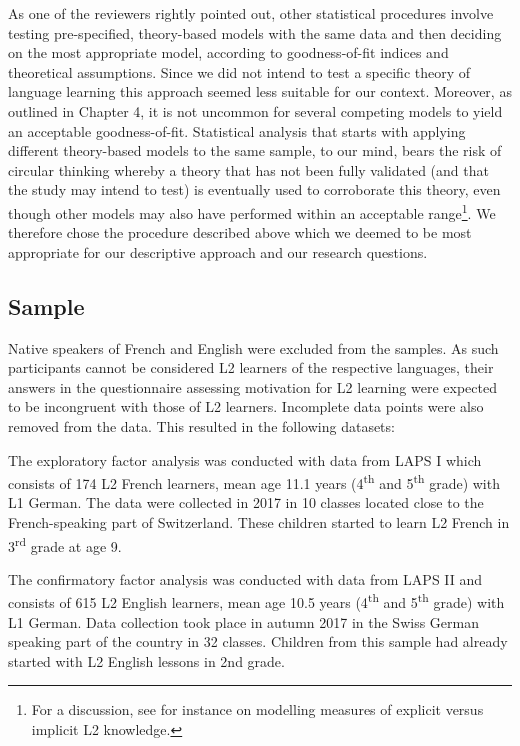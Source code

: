\documentclass[output=paper]{langsci/langscibook}
\begin{document}
As one of the reviewers rightly pointed out, other statistical procedures involve testing pre-specified, theory-based models with the same data and then deciding on the most appropriate model, according to goodness-of-fit indices and theoretical assumptions. Since we did not intend to test a specific theory of language learning this approach seemed less suitable for our context. Moreover, as outlined in Chapter 4, it is not uncommon for several competing models to yield an acceptable goodness-of-fit. Statistical analysis that starts with applying different theory-based models to the same sample, to our mind, bears the risk of circular thinking whereby a theory that has not been fully validated (and that the study may intend to test) is eventually used to corroborate this theory, even though other models may also have performed within an acceptable range\footnote{For a discussion, see for instance \citet{VafaeeEtAl2017} on modelling measures of explicit versus implicit L2 knowledge.}. We therefore chose the procedure described above which we deemed to be most appropriate for our descriptive approach and our research questions.

\subsection{Sample}

Native speakers of French and English were excluded from the samples. As such participants cannot be considered L2 learners of the respective languages, their answers in the questionnaire assessing motivation for L2 learning were expected to be incongruent with those of L2 learners. Incomplete data points were also removed from the data. This resulted in the following datasets:

The exploratory factor analysis was conducted with data from LAPS I which consists of 174 L2 French learners, mean age 11.1 years (4\textsuperscript{th} and 5\textsuperscript{th} grade) with L1 German. The data were collected in 2017 in 10 classes located close to the French-speaking part of Switzerland. These children started to learn L2 French in 3\textsuperscript{rd} grade at age 9. 

The confirmatory factor analysis was conducted with data from LAPS II and consists of 615 L2 English learners, mean age 10.5 years (4\textsuperscript{th} and 5\textsuperscript{th} grade) with L1 German. Data collection took place in autumn 2017 in the Swiss German speaking part of the country in 32 classes. Children from this sample had already started with L2 English lessons in 2nd grade. 
\end{document}
